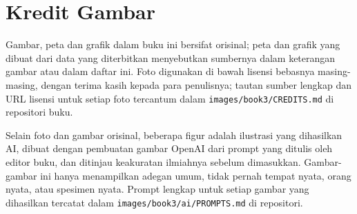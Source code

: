 \chapter*{Kredit Gambar}

Gambar, peta dan grafik dalam buku ini bersifat orisinal; peta dan grafik yang
dibuat dari data yang diterbitkan menyebutkan sumbernya dalam keterangan gambar
atau dalam daftar ini. Foto digunakan di bawah lisensi bebasnya masing-masing,
dengan terima kasih kepada para penulisnya; tautan sumber lengkap dan URL lisensi
untuk setiap foto tercantum dalam \texttt{images/book3/CREDITS.md} di repositori buku.

\bigskip
Selain foto dan gambar orisinal, beberapa figur adalah ilustrasi yang dihasilkan AI,
dibuat dengan pembuatan gambar OpenAI dari prompt yang ditulis oleh editor buku, dan
ditinjau keakuratan ilmiahnya sebelum dimasukkan. Gambar-gambar ini hanya menampilkan
adegan umum, tidak pernah tempat nyata, orang nyata, atau spesimen nyata. Prompt
lengkap untuk setiap gambar yang dihasilkan tercatat dalam
\texttt{images/book3/ai/PROMPTS.md} di repositori.

